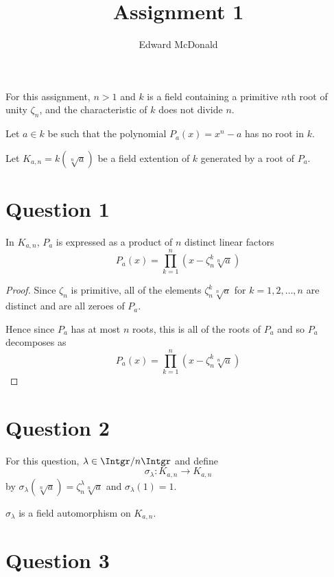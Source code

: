\documentclass{unswmaths}
\begin{document}
\subject{Galois Theory}
\author{Edward McDonald}
\title{Assignment 1}


\setlength\parindent{0pt}


\unswtitle{}

    For this assignment, $n > 1$ and $k$ is a field
    containing a primitive $n$th root of unity $\zeta_n$,
    and the characteristic of $k$ does not divide $n$.
    
    Let $a \in k$ be such that the polynomial
    $P_a(x) = x^n-a$ has no root in $k$.
    
    Let $K_{a,n} = k(\!\sqrt[n]{a})$ be a field extention
    of $k$ generated by a root of $P_a$.

\section*{Question 1}
\begin{lemma}
    In $K_{a,n}$, $P_a$ is expressed as a product of $n$ distinct linear
    factors 
    \begin{equation*}
        P_a(x) = \prod_{k=1}^n (x-\zeta_n^k\sqrt[n]{a})
    \end{equation*}
\end{lemma}
\begin{proof}
    Since $\zeta_n$ is primitive, all
    of the elements $\zeta_n^k\sqrt[n]{a}$ for $k = 1,2,\ldots,n$
    are distinct and are all zeroes of $P_a$.
    
    Hence since $P_a$ has at most $n$ roots, this is all of the roots
    of $P_a$ and so $P_a$ decomposes as
    \begin{equation*}
        P_a(x) = \prod_{k=1}^n (x-\zeta_n^k\sqrt[n]{a})
    \end{equation*}
\end{proof}

\section*{Question 2}
For this question, $\lambda \in \Intgr/n\Intgr$ and 
define
\begin{equation*}
    \sigma_\lambda: K_{a,n}\rightarrow K_{a,n}
\end{equation*}
by $\sigma_{\lambda}(\sqrt[n]{a}) = \zeta_n^\lambda \sqrt[n]{a}$
and $\sigma_\lambda(1) = 1$.
\begin{theorem}
    $\sigma_\lambda$ is a field automorphism on $K_{a,n}$.
\end{theorem}

\section*{Question 3}


    
    
    
    
    
\end{document}
